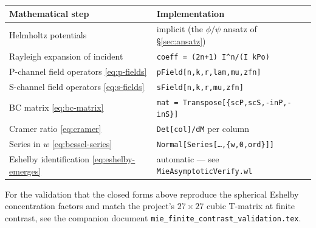 \documentclass[11pt,a4paper]{article}
\newcommand{\code}[1]{\texttt{#1}}
\begin{document}
\begin{center}
\begin{tabular}{ll}
\toprule
Mathematical step & Implementation \\
\midrule
Helmholtz potentials & implicit (the $\phi/\psi$ ansatz of \S\ref{sec:ansatz}) \\
Rayleigh expansion of incident & \code{coeff = (2n+1) I\^{}n/(I kPo)} \\
P-channel field operators
   \eqref{eq:p-fields} & \code{pField[n,k,r,lam,mu,zfn]} \\
S-channel field operators
   \eqref{eq:s-fields} & \code{sField[n,k,r,mu,zfn]} \\
BC matrix \eqref{eq:bc-matrix} & \code{mat = Transpose[\{scP,scS,-inP,-inS\}]} \\
Cramer ratio \eqref{eq:cramer} & \code{Det[col]/dM} per column \\
Series in $w$ \eqref{eq:bessel-series} & \code{Normal[Series[\dots,\{w,0,ord\}]]} \\
Eshelby identification \eqref{eq:eshelby-emerges} &
   automatic --- see \code{MieAsymptoticVerify.wl} \\
\bottomrule
\end{tabular}
\end{center}

\noindent For the validation that the closed forms above reproduce the
spherical Eshelby concentration factors and match the project's
$27\times 27$ cubic T-matrix at finite contrast, see the companion
document \code{mie\_finite\_contrast\_validation.tex}.
\end{document}
